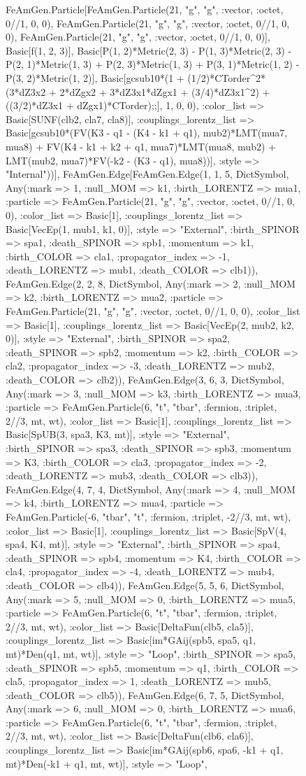 \documentclass{revtex4}
\begin{document}
\begin{figure}[!htb]
\begin{center}
{FeAmGen.Particle[FeAmGen.Particle(21, "g", "g", :vector, :octet, 0//1, 0, 0), FeAmGen.Particle(21, "g", "g", :vector, :octet, 0//1, 0, 0), FeAmGen.Particle(21, "g", "g", :vector, :octet, 0//1, 0, 0)], Basic[f(1, 2, 3)], Basic[P(1, 2)*Metric(2, 3) - P(1, 3)*Metric(2, 3) - P(2, 1)*Metric(1, 3) + P(2, 3)*Metric(1, 3) + P(3, 1)*Metric(1, 2) - P(3, 2)*Metric(1, 2)], Basic[gcsub10*(1 + (1/2)*CTorder^2*(3*dZ3x2 + 2*dZgx2 + 3*dZ3x1*dZgx1 + (3/4)*dZ3x1^2) + ((3/2)*dZ3x1 + dZgx1)*CTorder);;], 1, 0, 0), :color_list => Basic[SUNF(clb2, cla7, cla8)], :couplings_lorentz_list => Basic[gcsub10*(FV(K3 - q1 - (K4 - k1 + q1), mub2)*LMT(mua7, mua8) + FV(K4 - k1 + k2 + q1, mua7)*LMT(mua8, mub2) + LMT(mub2, mua7)*FV(-k2 - (K3 - q1), mua8))], :style => "Internal"))], FeAmGen.Edge[FeAmGen.Edge(1, 1, 5, Dict{Symbol, Any}(:mark => 1, :null_MOM => k1, :birth_LORENTZ => mua1, :particle => FeAmGen.Particle(21, "g", "g", :vector, :octet, 0//1, 0, 0), :color_list => Basic[1], :couplings_lorentz_list => Basic[VecEp(1, mub1, k1, 0)], :style => "External", :birth_SPINOR => spa1, :death_SPINOR => spb1, :momentum => k1, :birth_COLOR => cla1, :propagator_index => -1, :death_LORENTZ => mub1, :death_COLOR => clb1)), FeAmGen.Edge(2, 2, 8, Dict{Symbol, Any}(:mark => 2, :null_MOM => k2, :birth_LORENTZ => mua2, :particle => FeAmGen.Particle(21, "g", "g", :vector, :octet, 0//1, 0, 0), :color_list => Basic[1], :couplings_lorentz_list => Basic[VecEp(2, mub2, k2, 0)], :style => "External", :birth_SPINOR => spa2, :death_SPINOR => spb2, :momentum => k2, :birth_COLOR => cla2, :propagator_index => -3, :death_LORENTZ => mub2, :death_COLOR => clb2)), FeAmGen.Edge(3, 6, 3, Dict{Symbol, Any}(:mark => 3, :null_MOM => k3, :birth_LORENTZ => mua3, :particle => FeAmGen.Particle(6, "t", "tbar", :fermion, :triplet, 2//3, mt, wt), :color_list => Basic[1], :couplings_lorentz_list => Basic[SpUB(3, spa3, K3, mt)], :style => "External", :birth_SPINOR => spa3, :death_SPINOR => spb3, :momentum => K3, :birth_COLOR => cla3, :propagator_index => -2, :death_LORENTZ => mub3, :death_COLOR => clb3)), FeAmGen.Edge(4, 7, 4, Dict{Symbol, Any}(:mark => 4, :null_MOM => k4, :birth_LORENTZ => mua4, :particle => FeAmGen.Particle(-6, "tbar", "t", :fermion, :triplet, -2//3, mt, wt), :color_list => Basic[1], :couplings_lorentz_list => Basic[SpV(4, spa4, K4, mt)], :style => "External", :birth_SPINOR => spa4, :death_SPINOR => spb4, :momentum => K4, :birth_COLOR => cla4, :propagator_index => -4, :death_LORENTZ => mub4, :death_COLOR => clb4)), FeAmGen.Edge(5, 5, 6, Dict{Symbol, Any}(:mark => 5, :null_MOM => 0, :birth_LORENTZ => mua5, :particle => FeAmGen.Particle(6, "t", "tbar", :fermion, :triplet, 2//3, mt, wt), :color_list => Basic[DeltaFun(clb5, cla5)], :couplings_lorentz_list => Basic[im*GAij(spb5, spa5, q1, mt)*Den(q1, mt, wt)], :style => "Loop", :birth_SPINOR => spa5, :death_SPINOR => spb5, :momentum => q1, :birth_COLOR => cla5, :propagator_index => 1, :death_LORENTZ => mub5, :death_COLOR => clb5)), FeAmGen.Edge(6, 7, 5, Dict{Symbol, Any}(:mark => 6, :null_MOM => 0, :birth_LORENTZ => mua6, :particle => FeAmGen.Particle(6, "t", "tbar", :fermion, :triplet, 2//3, mt, wt), :color_list => Basic[DeltaFun(clb6, cla6)], :couplings_lorentz_list => Basic[im*GAij(spb6, spa6, -k1 + q1, mt)*Den(-k1 + q1, mt, wt)], :style => "Loop", }
\end{center}
\end{figure}
\end{document}
